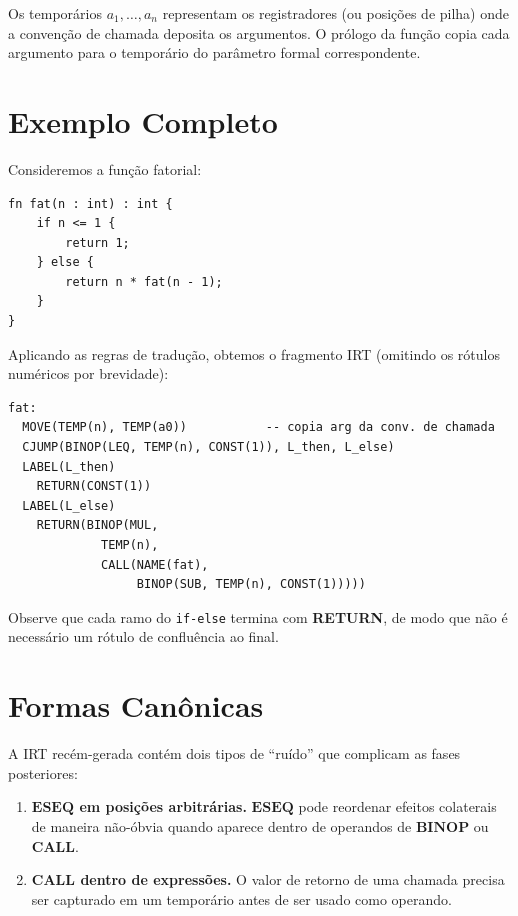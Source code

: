 Os temporários $a_1, \ldots, a_n$ representam os registradores (ou
posições de pilha) onde a convenção de chamada deposita os argumentos.
O prólogo da função copia cada argumento para o temporário do parâmetro
formal correspondente.

\section{Exemplo Completo}\label{sec:irt-example}

Consideremos a função fatorial:

\begin{verbatim}
fn fat(n : int) : int {
    if n <= 1 {
        return 1;
    } else {
        return n * fat(n - 1);
    }
}
\end{verbatim}

Aplicando as regras de tradução, obtemos o fragmento IRT (omitindo os
rótulos numéricos por brevidade):

\begin{verbatim}
fat:
  MOVE(TEMP(n), TEMP(a0))           -- copia arg da conv. de chamada
  CJUMP(BINOP(LEQ, TEMP(n), CONST(1)), L_then, L_else)
  LABEL(L_then)
    RETURN(CONST(1))
  LABEL(L_else)
    RETURN(BINOP(MUL,
             TEMP(n),
             CALL(NAME(fat),
                  BINOP(SUB, TEMP(n), CONST(1)))))
\end{verbatim}

Observe que cada ramo do \texttt{if-else} termina com \textbf{RETURN}, de
modo que não é necessário um rótulo de confluência ao final.

\section{Formas Canônicas}\label{sec:irt-canonical}

A IRT recém-gerada contém dois tipos de ``ruído'' que complicam as fases
posteriores:

\begin{enumerate}
  \item \textbf{$\mathbf{ESEQ}$ em posições arbitrárias.}
    $\mathbf{ESEQ}$ pode reordenar efeitos colaterais de maneira
    não-óbvia quando aparece dentro de operandos de $\mathbf{BINOP}$ ou
    $\mathbf{CALL}$.
  \item \textbf{$\mathbf{CALL}$ dentro de expressões.}
    O valor de retorno de uma chamada precisa ser capturado em um temporário
    antes de ser usado como operando.
\end{enumerate}

